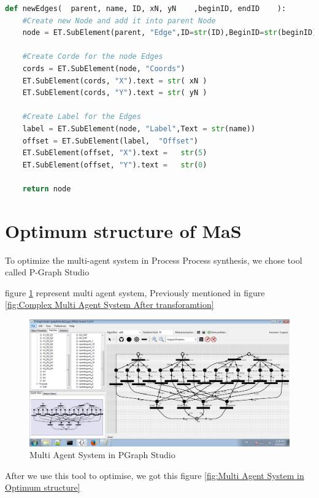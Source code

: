 \begin{lstlisting}[language=Python, caption=Python Function new Edges]
def newEdges(  parent, name, ID, xN, yN    ,beginID, endID    ):
	#Create new Node and add it into parent Node	
	node = ET.SubElement(parent, "Edge",ID=str(ID),BeginID=str(beginID),EndID=str(endID),Rate=str(name),Title=str(name), ArrowOnCenter="true", ArrowPosition="50")  
	
	#Create Corde for the node Edges
	cords = ET.SubElement(node, "Coords")
	ET.SubElement(cords, "X").text = str( xN )
	ET.SubElement(cords, "Y").text = str( yN )
		 		 		  
	#Create Label for the Edges
	label = ET.SubElement(node, "Label",Text = str(name))
	offset = ET.SubElement(label,  "Offset")
	ET.SubElement(offset, "X").text =   str(5)
	ET.SubElement(offset, "Y").text =   str(0)
 
	return node 
\end{lstlisting}


\pagebreak
\section{Optimum structure of MaS \label{sec:optim} }

To optimize the multi-agent system in  Process Process synthesis, we chose tool called  P-Graph Studio 

figure \ref{fig:Multi Agent System in PGraph Studio} represent multi agent system, Previously mentioned in figure \ref{fig:Complex Multi Agent System After transforamtion} 
\begin{figure}[th]
	\centering
		\includegraphics[scale=0.44]{ch3/img/pgraphArt}
	\caption{\label{fig:Multi Agent System in PGraph Studio}Multi Agent System in PGraph Studio}
\end{figure} 
\pagebreak
After we use this tool to optimise, we got this figure \ref{fig:Multi Agent System in Optimum structure}

